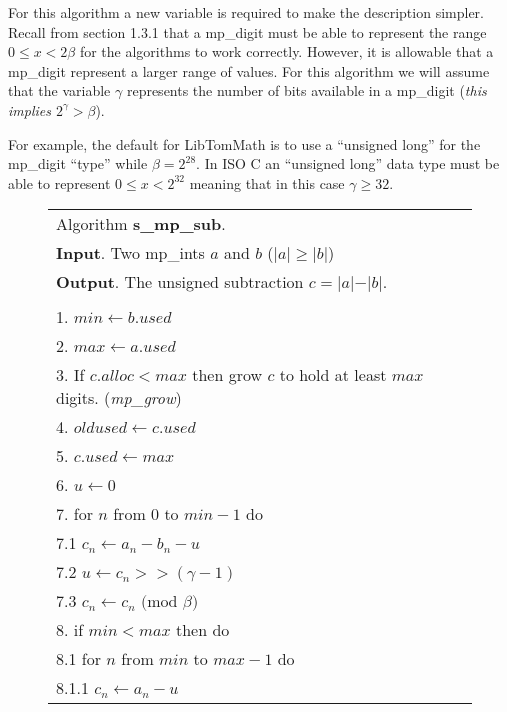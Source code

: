\documentclass[b5paper]{book}
\begin{document}
For this algorithm a new variable is required to make the description simpler.  Recall from section 1.3.1 that a mp\_digit must be able to represent
the range $0 \le x < 2\beta$ for the algorithms to work correctly.  However, it is allowable that a mp\_digit represent a larger range of values.  For 
this algorithm we will assume that the variable $\gamma$ represents the number of bits available in a 
mp\_digit (\textit{this implies $2^{\gamma} > \beta$}).  

For example, the default for LibTomMath is to use a ``unsigned long'' for the mp\_digit ``type'' while $\beta = 2^{28}$.  In ISO C an ``unsigned long''
data type must be able to represent $0 \le x < 2^{32}$ meaning that in this case $\gamma \ge 32$.

\newpage\begin{figure}[!here]
\begin{center}
\begin{small}
\begin{tabular}{l}
\hline Algorithm \textbf{s\_mp\_sub}. \\
\textbf{Input}.   Two mp\_ints $a$ and $b$ ($\vert a \vert \ge \vert b \vert$) \\
\textbf{Output}.  The unsigned subtraction $c = \vert a \vert - \vert b \vert$. \\
\hline \\
1.  $min \leftarrow b.used$ \\
2.  $max \leftarrow a.used$ \\
3.  If $c.alloc < max$ then grow $c$ to hold at least $max$ digits.  (\textit{mp\_grow}) \\
4.  $oldused \leftarrow c.used$ \\ 
5.  $c.used \leftarrow max$ \\
6.  $u \leftarrow 0$ \\
7.  for $n$ from $0$ to $min - 1$ do \\
\hspace{3mm}7.1  $c_n \leftarrow a_n - b_n - u$ \\
\hspace{3mm}7.2  $u   \leftarrow c_n >> (\gamma - 1)$ \\
\hspace{3mm}7.3  $c_n \leftarrow c_n \mbox{ (mod }\beta\mbox{)}$ \\
8.  if $min < max$ then do \\
\hspace{3mm}8.1  for $n$ from $min$ to $max - 1$ do \\
\hspace{6mm}8.1.1  $c_n \leftarrow a_n - u$ \\

\end{tabular}
\end{small}
\end{center}
\end{figure}
\end{document}
